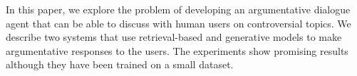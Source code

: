 In this paper, we explore the problem of developing an argumentative dialogue agent that can be able to discuss with human users on controversial topics. We describe two systems that use retrieval-based and generative models to make argumentative responses to the users. The experiments show promising results although they have been trained on a small dataset.

